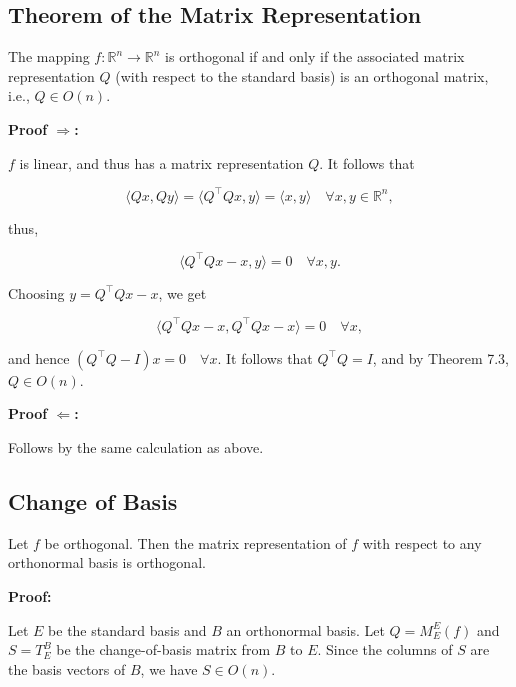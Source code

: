 \QED

\subsection{Theorem of the Matrix Representation}

The mapping \( f : \mathbb{R}^n \to \mathbb{R}^n \) is orthogonal if and only if  
the associated matrix representation \( Q \) (with respect to the standard basis) is an orthogonal matrix, i.e., \( Q \in O(n) \).
\vspace{\baselineskip}

\textbf{Proof \(\Rightarrow\):} 

\( f \) is linear, and thus has a matrix representation \( Q \). It follows that

\[
\langle Qx, Qy \rangle = \langle Q^\top Qx, y \rangle = \langle x, y \rangle \quad \forall x, y \in \mathbb{R}^n,
\]

thus,

\[
\langle Q^\top Qx - x, y \rangle = 0 \quad \forall x, y.
\]

Choosing \( y = Q^\top Qx - x \), we get

\[
\langle Q^\top Qx - x, Q^\top Qx - x \rangle = 0 \quad \forall x,
\]

and hence \( (Q^\top Q - I)x = 0 \quad \forall x \).  
It follows that \( Q^\top Q = I \), and by Theorem 7.3, \( Q \in O(n) \).

\QED
\vspace{\baselineskip}

\textbf{Proof \(\Leftarrow\):} 

Follows by the same calculation as above.

\QED

\subsection{Change of Basis}

Let \( f \) be orthogonal. Then the matrix representation of \( f \)  
with respect to any orthonormal basis is orthogonal.
\vspace{\baselineskip}

\textbf{Proof:} 

Let \( E \) be the standard basis and \( B \) an orthonormal basis. Let  
\( Q = M_E^E(f) \) and \( S = T_E^B \) be the change-of-basis matrix from \( B \) to \( E \).  
Since the columns of \( S \) are the basis vectors of \( B \), we have \( S \in O(n) \).  

